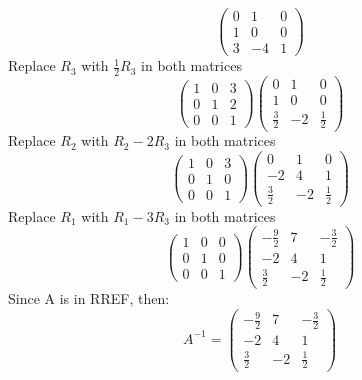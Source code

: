 \documentclass{article}
\begin{document}
\begin{homeworkProblem}
$$\begin{pmatrix}
            0 & 1  & 0 \\
            1 & 0  & 0 \\
            3 & -4 & 1
        \end{pmatrix}$$
    Replace $R_3$ with $\frac{1}{2}R_3$ in both matrices
    $$\begin{pmatrix}
            1 & 0 & 3 \\
            0 & 1 & 2 \\
            0 & 0 & 1
        \end{pmatrix}
        \begin{pmatrix}
            0           & 1  & 0           \\
            1           & 0  & 0           \\
            \frac{3}{2} & -2 & \frac{1}{2}
        \end{pmatrix}$$
    Replace $R_2$ with $R_2 - 2R_3$ in both matrices
    $$\begin{pmatrix}
            1 & 0 & 3 \\
            0 & 1 & 0 \\
            0 & 0 & 1
        \end{pmatrix}
        \begin{pmatrix}
            0           & 1  & 0           \\
            -2          & 4  & 1           \\
            \frac{3}{2} & -2 & \frac{1}{2}
        \end{pmatrix}$$
    Replace $R_1$ with $R_1 - 3R_3$ in both matrices
    $$\begin{pmatrix}
            1 & 0 & 0 \\
            0 & 1 & 0 \\
            0 & 0 & 1
        \end{pmatrix}
        \begin{pmatrix}
            -\frac{9}{2} & 7  & -\frac{3}{2} \\
            -2           & 4  & 1            \\
            \frac{3}{2}  & -2 & \frac{1}{2}
        \end{pmatrix}$$
    Since A is in RREF, then:
    $$A^{-1} = \begin{pmatrix}
        -\frac{9}{2} & 7  & -\frac{3}{2} \\
        -2           & 4  & 1            \\
        \frac{3}{2}  & -2 & \frac{1}{2}
    \end{pmatrix}$$
\end{homeworkProblem}
\end{document}
